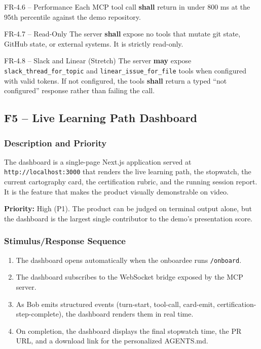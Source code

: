 \documentclass[11pt,letterpaper]{article}
\newcommand{\shall}{\textbf{shall}}
\newcommand{\may}{\textbf{may}}
\begin{document}
\begin{reqbox}{FR-4.6 -- Performance}
Each MCP tool call \shall{} return in under 800 ms at the 95th percentile against the demo repository.
\end{reqbox}

\begin{reqbox}{FR-4.7 -- Read-Only}
The server \shall{} expose no tools that mutate git state, GitHub state, or external systems. It is strictly read-only.
\end{reqbox}

\begin{reqbox}{FR-4.8 -- Slack and Linear (Stretch)}
The server \may{} expose \texttt{slack\_thread\_for\_topic} and \texttt{linear\_issue\_for\_file} tools when configured with valid tokens. If not configured, the tools \shall{} return a typed ``not configured'' response rather than failing the call.
\end{reqbox}

\subsection{F5 -- Live Learning Path Dashboard}

\subsubsection{Description and Priority}

The dashboard is a single-page Next.js application served at \texttt{http://localhost:3000} that renders the live learning path, the stopwatch, the current cartography card, the certification rubric, and the running session report. It is the feature that makes the product visually demonstrable on video.

\textbf{Priority:} High (P1). The product can be judged on terminal output alone, but the dashboard is the largest single contributor to the demo's presentation score.

\subsubsection{Stimulus/Response Sequence}

\begin{enumerate}
  \item The dashboard opens automatically when the onboardee runs \texttt{/onboard}.
  \item The dashboard subscribes to the WebSocket bridge exposed by the MCP server.
  \item As Bob emits structured events (turn-start, tool-call, card-emit, certification-step-complete), the dashboard renders them in real time.
  \item On completion, the dashboard displays the final stopwatch time, the PR URL, and a download link for the personalized AGENTS.md.
\end{enumerate}
\end{document}
